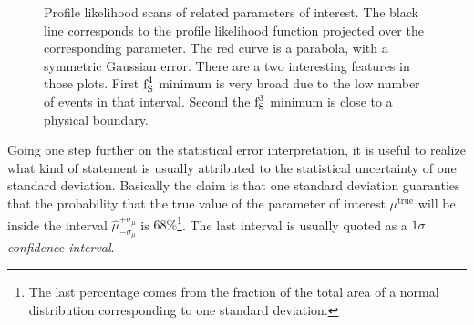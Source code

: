 \begin{figure}[!t]
  \begin{subfigure}{0.5\textwidth}
    \raggedright
    \scalebox{0.57}{}
    \caption{}
    \label{nll_ASMag2_bin3}
  \end{subfigure}%
  \hfill%
  \begin{subfigure}{0.5\textwidth}
    \raggedleft
    \scalebox{0.57}{}
    \caption{}
    \label{nll_ASPhase_bin3}
  \end{subfigure}
  \begin{subfigure}{0.5\textwidth}
    \raggedright
    \scalebox{0.57}{}
    \caption{}
    \label{nll_ASMag2_bin4}
  \end{subfigure}%
  \hfill%
  \begin{subfigure}{0.5\textwidth}
    \raggedleft
    \scalebox{0.57}{}
    \caption{}
    \label{nll_ASPhase_bin4}
  \end{subfigure}
\caption{Profile likelihood scans of \swave related parameters of interest. The black line corresponds to the profile likelihood
         function projected over the corresponding parameter. The red curve is a parabola, with a symmetric Gaussian
         error. There are a two interesting features in those plots. First $\text{f}_{\text{S}}^{4}$ minimum is very broad due to the
         low number of events in that \mkpi interval. Second the $\text{f}_{\text{S}}^{3}$ minimum is close to a physical boundary.}
\end{figure}

Going one step further on the statistical error interpretation, it is useful to realize what kind of statement is usually
attributed to the statistical uncertainty of one standard deviation. Basically the claim is that one standard deviation
guaranties that the probability that the true value of the parameter of interest $\mu^{\text{true}}$ will be inside the
interval $\hat{\mu}_{-\sigma_\mu}^{+\sigma_\mu}$ is $68\%$\footnote{The last percentage comes from the fraction of the total area of a normal distribution corresponding to one standard deviation.}.
The last interval is usually quoted as a $1\sigma$ {\it confidence interval}.






